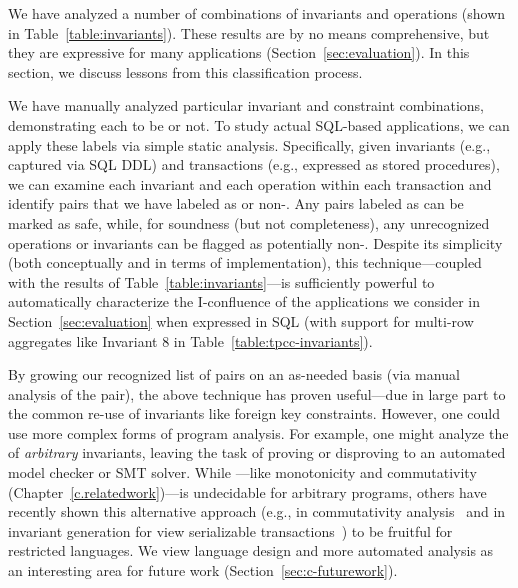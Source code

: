 We have analyzed a number of combinations of invariants and operations
(shown in Table~\ref{table:invariants}). These results are by no
means comprehensive, but they are expressive for many applications
(Section~\ref{sec:evaluation}). In this section, we discuss lessons from this
classification process.

 We have manually analyzed particular
invariant and constraint combinations, demonstrating each to be
\iconfluent or not. To study actual SQL-based applications, we can
apply these labels via simple static analysis. Specifically, given
invariants (e.g., captured via SQL DDL) and transactions (e.g.,
expressed as stored procedures), we can examine each invariant and
each operation within each transaction and identify pairs that we have
labeled as \iconfluent or non-\iconfluent. Any pairs labeled as
\iconfluent can be marked as safe, while, for soundness (but not
completeness), any unrecognized operations or invariants can be
flagged as potentially non-\iconfluent. Despite its simplicity (both
conceptually and in terms of implementation), this technique---coupled
with the results of Table~\ref{table:invariants}---is sufficiently
powerful to automatically characterize the I-confluence of the
applications we consider in Section~\ref{sec:evaluation} when
expressed in SQL (with support for multi-row aggregates like Invariant
8 in Table~\ref{table:tpcc-invariants}).

By growing our recognized list of \iconfluent pairs on an as-needed
basis (via manual analysis of the pair), the above technique has
proven useful---due in large part to the common re-use of invariants
like foreign key constraints. However, one could use more complex
forms of program analysis. For example, one might analyze the
\iconfluence of \textit{arbitrary} invariants, leaving the task of
proving or disproving \iconfluence to an automated model checker or
SMT solver. While \iconfluence---like monotonicity and commutativity
(Chapter~\ref{c.relatedwork})---is undecidable for arbitrary
programs, others have recently shown this alternative approach (e.g.,
in commutativity analysis~\cite{kohler-commutativity,redblue-new} and
in invariant generation for view serializable
transactions~\cite{homeostasis}) to be fruitful for restricted
languages. We view language design and more automated analysis as an
interesting area for future work (Section~\ref{sec:c-futurework}).

